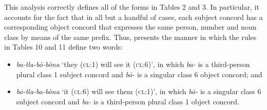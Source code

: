 \documentclass[output=paper,
modfonts
]{LSP/langsci}
\begin{document}
  This analysis correctly defines all of the forms in Tables 2 and 3.  In particular, it accounts for the fact that in all but a handful of cases, each subject concord has a corresponding object concord that expresses the same person, number and noun class by means of the same prefix.  Thus,  presents the manner in which the rules in Tables 10 and 11 define two words:  

\begin{itemize}
\item 
\textit{ba\nobreakdash-tla\nobreakdash-b\=o\nobreakdash-bòna}  ‘they (\textsc{cl}:1) will see it (\textsc{cl}:6)’, in which \textit{ba\nobreakdash-} is a third\nobreakdash-person plural class 1 subject concord and \textit{b\=o\nobreakdash-} is a singular class 6 object concord; and
\item
\textit{b\=o\nobreakdash-tla\nobreakdash-ba\nobreakdash-bòna}  ‘it (\textsc{cl}:6) will see them (\textsc{cl}:1)’, in which \textit{b}\textit{\=o}\textit{\nobreakdash-} is a singular class 6 subject concord and \textit{ba\nobreakdash-} is a third\nobreakdash-person plural class 1 object concord. 
\end{itemize}
\end{document}
